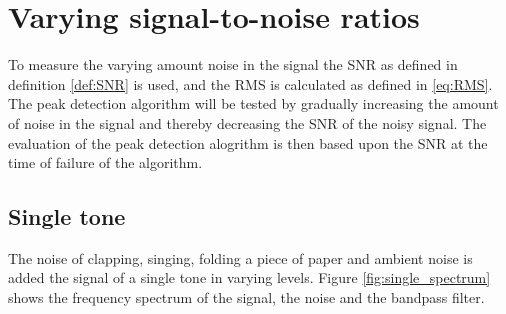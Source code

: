 \section{Varying signal-to-noise ratios}
To measure the varying amount noise in the signal the SNR as defined in definition \ref{def:SNR} is used, and the RMS is calculated as defined in \eqref{eq:RMS}. The peak detection algorithm will be tested by gradually increasing the amount of noise in the signal and thereby decreasing the SNR of the noisy signal. The evaluation of the peak detection alogrithm is then based upon the SNR at the time of failure of the algorithm.

\subsection{Single tone}
The noise of clapping, singing, folding a piece of paper and ambient noise is added the signal of a single tone in varying levels. Figure \ref{fig:single_spectrum} shows the frequency spectrum of the signal, the noise and the bandpass filter.

